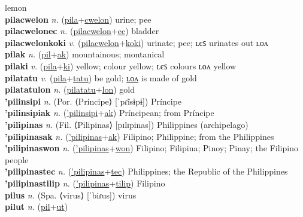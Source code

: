 lemon \label{pilaceluk} \\
\textbf{pilacwelon} \textit{n.} (\hyperref[pila]{pila}+\hyperref[cwelon]{cwelon})
urine; pee \label{pilacwelon} \\
\textbf{pilacwelonec} \textit{n.} (\hyperref[pilacwelon]{pilacwelon}+\hyperref[ec]{ec})
bladder \label{pilacwelonec} \\
\textbf{pilacwelonkoki} \textit{v.} (\hyperref[pilacwelon]{pilacwelon}+\hyperref[koki]{koki})
urinate; pee; ʟєꜱ urinates out ʟᴏᴧ \label{pilacwelonkoki} \\
\textbf{pilak} \textit{n.} (\hyperref[pil]{pil}+\hyperref[ak]{ak})
mountainous; montanical \label{pilak} \\
\textbf{pilaki} \textit{v.} (\hyperref[pila]{pila}+\hyperref[ki]{ki})
yellow; colour yellow; ʟєꜱ colours ʟᴏᴧ yellow \label{pilaki} \\
\textbf{pilatatu} \textit{v.} (\hyperref[pila]{pila}+\hyperref[tatu]{tatu})
be gold; \hyperref[pilatatulon]{ʟᴏᴧ} is made of gold \label{pilatatu} \\
\textbf{pilatatulon} \textit{n.} (\hyperref[pilatatu]{pilatatu}+\hyperref[lon]{lon})
gold \label{pilatatulon} \\
\textbf{'pilinsipi} \textit{n.} (Por. ⟨Príncipe⟩ [ˈpɾĩsɨpɨ])
Príncipe \label{'pilinsipi} \\
\textbf{'pilinsipiak} \textit{n.} (\hyperref['pilinsipi]{'pilinsipi}+\hyperref[ak]{ak})
Príncipean; from Príncipe \label{'pilinsipiak} \\
\textbf{'pilipinas} \textit{n.} (Fil. ⟨Pilipinas⟩ [pɪlɪpinas])
Philippines (archipelago) \label{'pilipinas} \\
\textbf{'pilipinasak} \textit{n.} (\hyperref['pilipinas]{'pilipinas}+\hyperref[ak]{ak})
Filipino; Philippine; from the Philippines \label{'pilipinasak} \\
\textbf{'pilipinaswon} \textit{n.} (\hyperref['pilipinas]{'pilipinas}+\hyperref[won]{won})
Filipino; Filipina; Pinoy; Pinay; the Filipino people \label{'pilipinaswon} \\
\textbf{'pilipinastec} \textit{n.} (\hyperref['pilipinas]{'pilipinas}+\hyperref[tec]{tec})
Philippines; the Republic of the Philippines \label{'pilipinastec} \\
\textbf{'pilipinastilip} \textit{n.} (\hyperref['pilipinas]{'pilipinas}+\hyperref[tilip]{tilip})
Filipino \label{'pilipinastilip} \\
\textbf{pilus} \textit{n.} (Spa. ⟨virus⟩ [ˈbiɾus])
virus \label{pilus} \\
\textbf{pilut} \textit{n.} (\hyperref[pil]{pil}+\hyperref[ut]{ut})
